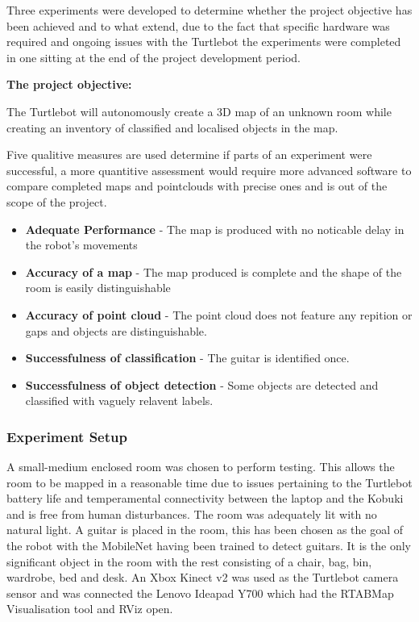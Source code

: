 \documentclass{mproj}
\begin{document}
Three experiments were developed to determine whether the project objective has been achieved and to what extend, due to the fact that specific hardware was required and ongoing issues with the Turtlebot the experiments were completed in one sitting at the end of the project development period. 
\begin{tcolorbox}
\textbf{The project objective:} 

The Turtlebot will autonomously create a 3D map of an unknown room while creating an inventory of classified and localised objects in the map.
\end{tcolorbox}
Five qualitive measures are used determine if parts of an experiment were successful, a more quantitive assessment would require more advanced software to compare completed maps and pointclouds with precise ones and is out of the scope of the project. 
\begin{itemize}
\item \textbf{Adequate Performance} - The map is produced with no noticable delay in the robot's movements 

\item \textbf{Accuracy of a map} - The map produced is complete and the shape of the room is easily distinguishable

\item \textbf{Accuracy of point cloud} - The point cloud does not feature any repition or gaps and objects are distinguishable.

\item \textbf{Successfulness of classification} - The guitar is identified once.

\item \textbf{Successfulness of object detection} - Some objects are detected and classified with vaguely relavent labels.
\end{itemize}
\subsubsection{Experiment Setup}

A small-medium enclosed room was chosen to perform testing. This allows the room to be mapped in a reasonable time due to issues pertaining to the Turtlebot battery life and temperamental connectivity between the laptop and the Kobuki and is free from human disturbances. The room was adequately lit with no natural light. A guitar is placed in the room, this has been chosen as the goal of the robot with the MobileNet having been trained to detect guitars. It is the only significant object in the room with the rest consisting of a chair, bag, bin, wardrobe, bed and desk. An Xbox Kinect v2 was used as the Turtlebot camera sensor and was connected the Lenovo Ideapad Y700 which had the RTABMap Visualisation tool and RViz open.
\end{document}
